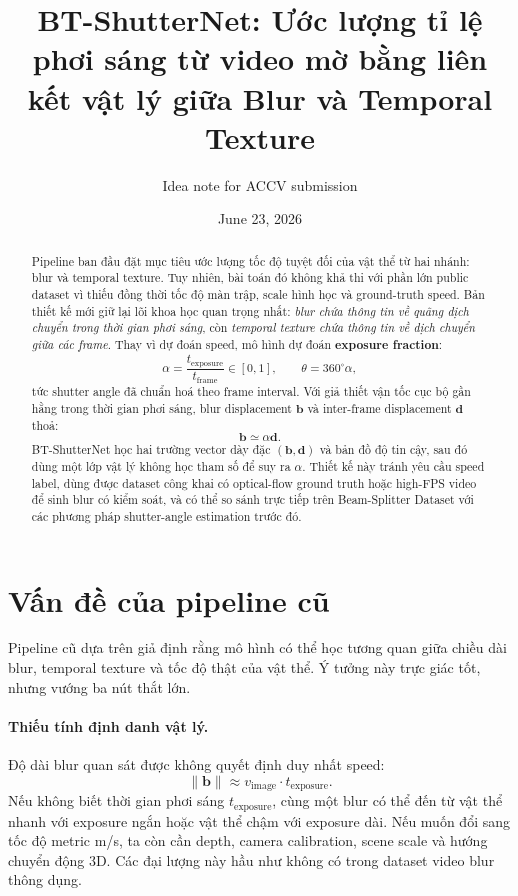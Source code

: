 \documentclass[11pt,a4paper]{article}
\title{\textbf{BT-ShutterNet: Ước lượng tỉ lệ phơi sáng từ video mờ bằng liên kết vật lý giữa Blur và Temporal Texture}}
\author{Idea note for ACCV submission}
\date{June 23, 2026}
\newcommand{\vect}[1]{\mathbf{#1}}
\begin{document}
\maketitle

\begin{abstract}
Pipeline ban đầu đặt mục tiêu ước lượng tốc độ tuyệt đối của vật thể từ hai nhánh: blur và temporal texture. Tuy nhiên, bài toán đó không khả thi với phần lớn public dataset vì thiếu đồng thời tốc độ màn trập, scale hình học và ground-truth speed. Bản thiết kế mới giữ lại lõi khoa học quan trọng nhất: \emph{blur chứa thông tin về quãng dịch chuyển trong thời gian phơi sáng}, còn \emph{temporal texture chứa thông tin về dịch chuyển giữa các frame}. Thay vì dự đoán speed, mô hình dự đoán \textbf{exposure fraction}:
\[
    \alpha = \frac{t_{\mathrm{exposure}}}{t_{\mathrm{frame}}} \in [0,1],
    \qquad
    \theta = 360^\circ \alpha,
\]
tức shutter angle đã chuẩn hoá theo frame interval. Với giả thiết vận tốc cục bộ gần hằng trong thời gian phơi sáng, blur displacement $\vect b$ và inter-frame displacement $\vect d$ thoả:
\[
    \vect b \simeq \alpha \vect d.
\]
BT-ShutterNet học hai trường vector dày đặc $(\vect b,\vect d)$ và bản đồ độ tin cậy, sau đó dùng một lớp vật lý không học tham số để suy ra $\alpha$. Thiết kế này tránh yêu cầu speed label, dùng được dataset công khai có optical-flow ground truth hoặc high-FPS video để sinh blur có kiểm soát, và có thể so sánh trực tiếp trên Beam-Splitter Dataset với các phương pháp shutter-angle estimation trước đó.
\end{abstract}

\section{Vấn đề của pipeline cũ}

Pipeline cũ dựa trên giả định rằng mô hình có thể học tương quan giữa chiều dài blur, temporal texture và tốc độ thật của vật thể. Ý tưởng này trực giác tốt, nhưng vướng ba nút thắt lớn.

\paragraph{Thiếu tính định danh vật lý.}
Độ dài blur quan sát được không quyết định duy nhất speed:
\[
    \|\vect b\| \approx v_{\mathrm{image}} \cdot t_{\mathrm{exposure}}.
\]
Nếu không biết thời gian phơi sáng $t_{\mathrm{exposure}}$, cùng một blur có thể đến từ vật thể nhanh với exposure ngắn hoặc vật thể chậm với exposure dài. Nếu muốn đổi sang tốc độ metric m/s, ta còn cần depth, camera calibration, scene scale và hướng chuyển động 3D. Các đại lượng này hầu như không có trong dataset video blur thông dụng.
\end{document}
